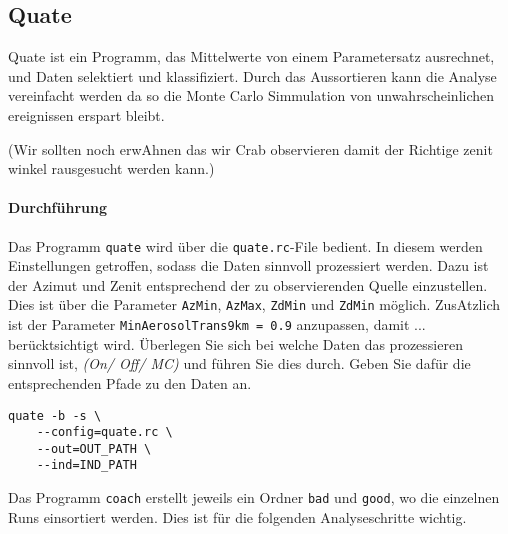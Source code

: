 \subsection{Quate}%
\label{sub:quate}

Quate ist ein Programm,
das Mittelwerte von einem Parametersatz ausrechnet,
und Daten selektiert und klassifiziert.
Durch das Aussortieren kann die Analyse vereinfacht werden da so die Monte Carlo
Simmulation von unwahrscheinlichen ereignissen erspart bleibt. 

(Wir sollten noch erwAhnen das wir Crab observieren damit der Richtige zenit
winkel rausgesucht werden kann.)

\paragraph{Durchführung}%
Das Programm \texttt{quate} wird über die 
\texttt{quate.rc}-File bedient.
In diesem werden Einstellungen getroffen, 
sodass die Daten sinnvoll prozessiert werden.
Dazu ist der Azimut und Zenit entsprechend der zu 
observierenden Quelle einzustellen. 
Dies ist über die Parameter \texttt{AzMin},
\texttt{AzMax}, \texttt{ZdMin} und \texttt{ZdMin}
möglich.
ZusAtzlich ist der Parameter 
\texttt{MinAerosolTrans9km = 0.9} anzupassen, 
damit ... berücktsichtigt wird.
Überlegen Sie sich bei welche Daten das prozessieren sinnvoll ist, 
\textit{(On/ Off/ MC)} und führen Sie dies durch.
Geben Sie dafür die entsprechenden Pfade zu den Daten an.
\begin{lstlisting}
quate -b -s \
	--config=quate.rc \
	--out=OUT_PATH \ 
	--ind=IND_PATH 
\end{lstlisting}
Das Programm \texttt{coach} erstellt jeweils ein Ordner 
\texttt{bad} und \texttt{good},
wo die einzelnen Runs einsortiert werden. 
Dies ist für die folgenden Analyseschritte wichtig.
